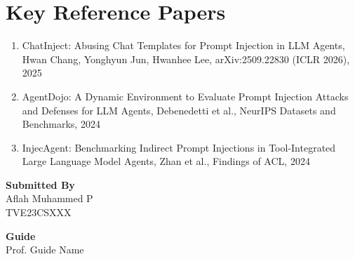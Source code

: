 \documentclass[12pt]{article}
\newcommand{\studentname}{Aflah Muhammed P}
\newcommand{\rollno}{TVE23CSXXX}
\newcommand{\guidename}{Prof. Guide Name}
\begin{document}
\section*{Key Reference Papers}
\begin{enumerate}
  \item ChatInject: Abusing Chat Templates for Prompt Injection in LLM Agents, Hwan Chang, Yonghyun Jun, Hwanhee Lee, arXiv:2509.22830 (ICLR 2026), 2025
  \item AgentDojo: A Dynamic Environment to Evaluate Prompt Injection Attacks and Defenses for LLM Agents, Debenedetti et al., NeurIPS Datasets and Benchmarks, 2024
  \item InjecAgent: Benchmarking Indirect Prompt Injections in Tool-Integrated Large Language Model Agents, Zhan et al., Findings of ACL, 2024
\end{enumerate}
\vspace{1.5em}

\noindent\textbf{Submitted By}\\
\studentname\\
\rollno

\vspace{1em}
\noindent\textbf{Guide}\\
\guidename
\end{document}
